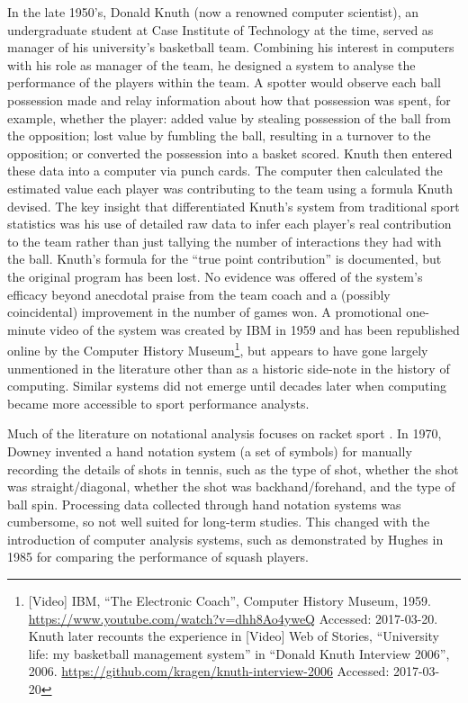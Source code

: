 In the late 1950's, Donald Knuth (now a renowned computer scientist), an undergraduate student at Case Institute of Technology at the time, served as manager of his university's basketball team. Combining his interest in computers with his role as manager of the team, he designed a system to analyse the performance of the players within the team. A spotter would observe each ball possession made and relay information about how that possession was spent, for example, whether the player: added value by stealing possession of the ball from the opposition; lost value by fumbling the ball, resulting in a turnover to the opposition; or converted the possession into a basket scored. Knuth then entered these data into a computer via punch cards. The computer then calculated the estimated value each player was contributing to the team using a formula Knuth devised. The key insight that differentiated Knuth's system from traditional sport statistics was his use of detailed raw data to infer each player's real contribution to the team rather than just tallying the number of interactions they had with the ball. Knuth's formula for the ``true point contribution'' \cite{Knuth2011} is documented, but the original program has been lost. No evidence was offered of the system's efficacy beyond anecdotal praise from the team coach and a (possibly coincidental) improvement in the number of games won. A promotional one-minute video of the system was created by IBM in 1959 and has been republished online by the Computer History Museum\footnote{[Video] IBM, ``The Electronic Coach'', Computer History Museum, 1959. \url{https://www.youtube.com/watch?v=dhh8Ao4yweQ} Accessed: 2017-03-20. Knuth later recounts the experience in [Video] Web of Stories, ``University life: my basketball management system'' in ``Donald Knuth Interview 2006'', 2006. \url{https://github.com/kragen/knuth-interview-2006} Accessed: 2017-03-20}, but appears to have gone largely unmentioned in the literature other than as a historic side-note in the history of computing. Similar systems did not emerge until decades later when computing became more accessible to sport performance analysts.


Much of the literature on notational analysis focuses on racket
sport \cite{Hughes2007}. %
In 1970, Downey \cite{downey_singles_1976} invented a hand notation system (a set of
symbols) for manually recording the details of shots in tennis, such as
the type of shot, whether the shot was straight/diagonal, whether the
shot was backhand/forehand, and the type of ball spin. Processing data
collected through hand notation systems was cumbersome, so not well
suited for long-term studies. This changed with the introduction of
computer analysis systems, such as demonstrated by Hughes in 1985
\cite{Hughes1985} for comparing the performance of squash
players.

